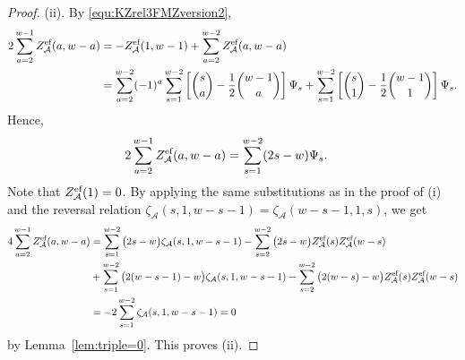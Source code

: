 \documentclass{article}
\newcommand{\calA}{\mathcal{A}}
\newcommand{\eff}{\text{\rm{ef}}}
\theoremstyle{plain}
\theoremstyle{definition}
\begin{document}
\begin{proof}
\bigskip
(ii). By \eqref{equ:KZrel3FMZversion2},
\begin{align*}
2 \sum_{a=2}^{w-1} Z_\calA^\eff(a,w-a)& = -Z_\calA^\eff(1,w-1)+ \sum_{a=2}^{w-2} Z_\calA^\eff(a,w-a)\\
& = \sum_{a=2}^{w-2} (-1)^a \sum_{s=1}^{w-2} \left[ \binom{s}{a}-\frac12\binom{w-1}{a}\right] \Psi_s
+\sum_{s=1}^{w-2} \left[ \binom{s}{1}-\frac12\binom{w-1}{1}\right] \Psi_s.
\end{align*}
Hence,
\begin{align*}
2 \sum_{a=2}^{w-1} Z_\calA^\eff(a,w-a)
& = \sum_{s=1}^{w-2}(2s-w) \Psi_s.
\end{align*}
Note that $Z_\calA^\eff(1)=0$. By applying the same substitutions as in the proof of (i) and the reversal relation $\zeta_\calA(s,1,w-s-1)=\zeta_\calA(w-s-1,1,s)$, we get
\begin{align*}
4\sum_{a=2}^{w-1} Z_\calA^\eff(a,w-a)
& =  \sum_{s=1}^{w-2}\big(2s-w\big)\zeta_\calA(s,1,w-s-1)
- \sum_{s=2}^{w-2}\big(2s-w\big) Z_\calA^\eff(s)Z_\calA^\eff(w-s)\\
&+ \sum_{s=1}^{w-2}\big(2(w-s-1)-w\big) \zeta_\calA(s,1,w-s-1)
-\sum_{s=2}^{w-2}\big(2(w-s)-w\big) Z_\calA^\eff(s)Z_\calA^\eff(w-s)\\
&=-2\sum_{s=1}^{w-2} \zeta_\calA(s,1,w-s-1)=0
\end{align*}
by Lemma~\ref{lem:triple=0}. This proves (ii).


\end{proof}
\end{document}
